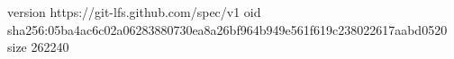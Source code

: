 version https://git-lfs.github.com/spec/v1
oid sha256:05ba4ac6c02a06283880730ea8a26bf964b949e561f619c238022617aabd0520
size 262240
